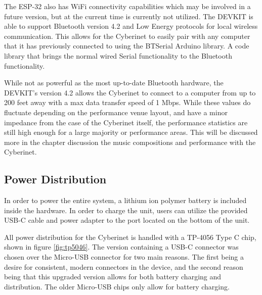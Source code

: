 The ESP-32 also has WiFi connectivity capabilities which may be involved in a future version, but at the current time is currently not utilized. The DEVKIT is able to support Bluetooth version 4.2 and Low Energy protocols for local wireless communication. This allows for the Cyberinet to easily pair with any computer that it has previously connected to using the BTSerial Arduino library. A code library that brings the normal wired Serial functionality to the Bluetooth functionality.

While not as powerful as the most up-to-date Bluetooth hardware, the DEVKIT's version 4.2 allows the Cyberinet to connect to a computer from up to 200 feet away with a max data transfer speed of 1 Mbps. While these values do fluctuate depending on the performance venue layout, and have a minor impedance from the case of the Cyberinet itself, the performance statistics are still high enough for a large majority or performance areas. This will be discussed more in the chapter discussion the music compositions and performance with the Cyberinet. 


\subsection{Power Distribution}
In order to power the entire system, a lithium ion polymer battery is included inside the hardware. In order to charge the unit, users can utilize the provided USB-C cable and power adapter to the port located on the bottom of the unit. %


All power distribution for the Cyberinet is handled with a TP-4056 Type C chip, shown in figure \ref{fig:tp5046}. The version containing a USB-C connector was chosen over the Micro-USB connector for two main reasons. The first being a desire for consistent, modern connectors in the device, and the second reason being that this upgraded version allows for both battery charging and distribution. The older Micro-USB chips only allow for battery charging.


